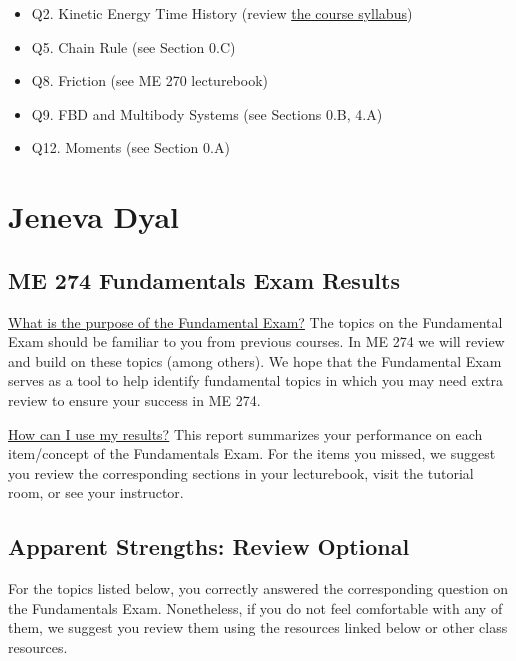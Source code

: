 \documentclass[11pt,letterpaper]{article}\usepackage[]{graphicx}\usepackage[]{color}
\begin{document}
\begin{itemize}\item Q2. Kinetic Energy Time History (review \href{https://www.purdue.edu/freeform/dynamics/wp-content/uploads/sites/4/2018/01/Syllabus-Spring-2018.pdf}{the course syllabus})
\item Q5. Chain Rule (see Section 0.C)
\item Q8. Friction (see ME 270 lecturebook)
\item Q9. FBD and Multibody Systems (see Sections 0.B, 4.A)
\item Q12. Moments (see Section 0.A)
\end{itemize}

\pagebreak
\section*{Jeneva Dyal}
\subsection*{ME 274 Fundamentals Exam Results}
\underline{What is the purpose of the Fundamental Exam?}  The topics on the Fundamental Exam should be familiar to you from previous courses.  In ME 274 we will review and build on these topics (among others). We hope that the Fundamental Exam serves as a tool to help identify fundamental topics in which you may need extra review to ensure your success in ME 274.\

\underline{How can I use my results?}  This report summarizes your performance on each item/concept of the Fundamentals Exam.  For the items you missed, we suggest you review the corresponding sections in your lecturebook, visit the tutorial room, or see your instructor.

\subsection*{Apparent Strengths: Review Optional}
For the topics listed below, you correctly answered the corresponding question on the Fundamentals Exam.  Nonetheless, if you do not feel comfortable with any of them, we suggest you review them using the resources linked below or other class resources.
\end{document}
